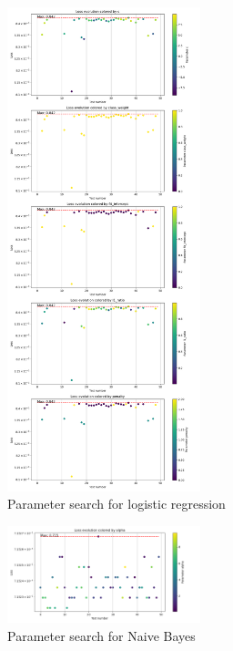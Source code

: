 \documentclass{article}
\begin{document}
    \begin{figure}[H]
        \centering
        \includegraphics[width=0.5\textwidth]{report_img/param_search/logistic_regression}
        \caption{Parameter search for logistic regression}
        \label{fig:}
    \end{figure}

    \begin{figure}[H]
        \centering
        \includegraphics[width=0.5\textwidth]{report_img/param_search/naive_bayes}
        \caption{Parameter search for Naive Bayes}
        \label{fig:}
    \end{figure}
\end{document}
